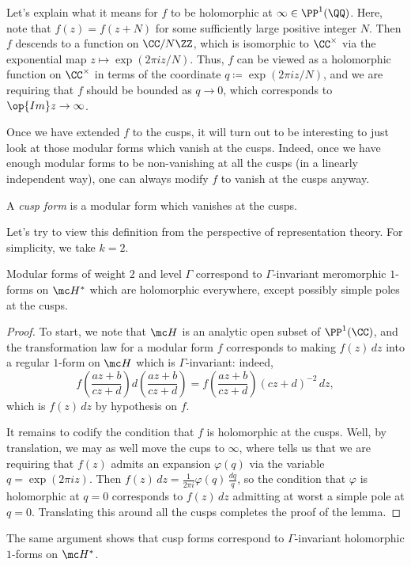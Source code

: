 \documentclass[../notes.tex]{subfiles}
\begin{document}
\begin{example} \label{ex:bounded-at-infinity}
	Let's explain what it means for $f$ to be holomorphic at $\infty\in\PP^1(\QQ)$. Here, note that $f(z)=f(z+N)$ for some sufficiently large positive integer $N$. Then $f$ descends to a function on $\CC/N\ZZ$, which is isomorphic to $\CC^\times$ via the exponential map $z\mapsto\exp(2\pi iz/N)$. Thus, $f$ can be viewed as a holomorphic function on $\CC^\times$ in terms of the coordinate $q\coloneqq\exp(2\pi iz/N)$, and we are requiring that $f$ should be bounded as $q\to0$, which corresponds to $\op{Im}z\to\infty$.
\end{example}
Once we have extended $f$ to the cusps, it will turn out to be interesting to just look at those modular forms which vanish at the cusps. Indeed, once we have enough modular forms to be non-vanishing at all the cusps (in a linearly independent way), one can always modify $f$ to vanish at the cusps anyway.
\begin{definition}
	A \textit{cusp form} is a modular form which vanishes at the cusps.
\end{definition}
Let's try to view this definition from the perspective of representation theory. For simplicity, we take $k=2$.
\begin{lemma}
	Modular forms of weight $2$ and level $\Gamma$ correspond to $\Gamma$-invariant meromorphic $1$-forms on $\mc H^*$ which are holomorphic everywhere, except possibly simple poles at the cusps.
\end{lemma}
\begin{proof}
	To start, we note that $\mc H$ is an analytic open subset of $\PP^1(\CC)$, and the transformation law for a modular form $f$ corresponds to making $f(z)\,dz$ into a regular $1$-form on $\mc H$ which is $\Gamma$-invariant: indeed,
	\[f\left(\frac{az+b}{cz+d}\right)d\left(\frac{az+b}{cz+d}\right)=f\left(\frac{az+b}{cz+d}\right)(cz+d)^{-2}\,dz,\]
	which is $f(z)\,dz$ by hypothesis on $f$.
	
	It remains to codify the condition that $f$ is holomorphic at the cusps. Well, by translation, we may as well move the cups to $\infty$, where  tells us that we are requiring that $f(z)$ admits an expansion $\varphi(q)$ via the variable $q=\exp(2\pi iz)$. Then $f(z)\,dz=\frac1{2\pi i}\varphi(q)\,\frac{dq}q$, so the condition that $\varphi$ is holomorphic at $q=0$ corresponds to $f(z)\,dz$ admitting at worst a simple pole at $q=0$. Translating this around all the cusps completes the proof of the lemma.
\end{proof}
\begin{remark}
	The same argument shows that cusp forms correspond to $\Gamma$-invariant holomorphic $1$-forms on $\mc H^*$.
\end{remark}
\end{document}
